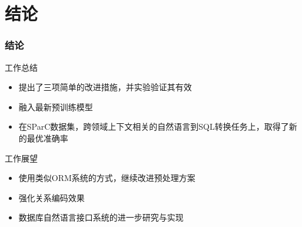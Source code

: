 \documentclass{ctexbeamer}
\begin{document}
\section{结论}
\begin{frame}
  \frametitle{结论}
  \begin{block}{工作总结}
    \begin{itemize}
      \item 提出了三项简单的改进措施，并实验验证其有效
      \item 融入最新预训练模型
      \item 在SParC数据集，跨领域上下文相关的自然语言到SQL转换任务上，取得了新的最优准确率
    \end{itemize}
  \end{block}
  \begin{block}{工作展望}
    \begin{itemize}
      \item 使用类似ORM系统的方式，继续改进预处理方案
      \item 强化关系编码效果
      \item 数据库自然语言接口系统的进一步研究与实现
    \end{itemize}
  \end{block}
\end{frame}
\end{document}
